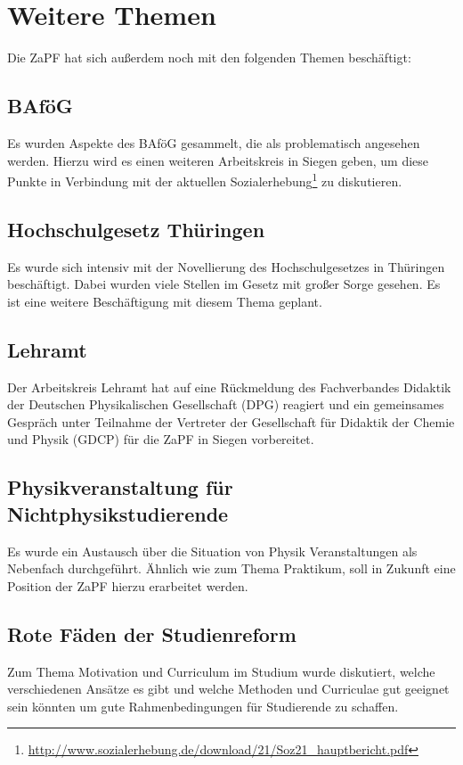 \documentclass[a4paper]{article}
\begin{document}
        
\section*{Weitere Themen}

Die ZaPF hat sich außerdem noch mit den folgenden Themen beschäftigt:

\subsection*{BAföG}
Es wurden Aspekte des BAföG gesammelt, die als problematisch angesehen werden.
Hierzu wird es einen weiteren Arbeitskreis in Siegen geben, um diese Punkte in Verbindung mit der aktuellen Sozialerhebung\footnote{\href{http://www.sozialerhebung.de/download/21/Soz21_hauptbericht.pdf}{\url{http://www.sozialerhebung.de/download/21/Soz21_hauptbericht.pdf}}} zu diskutieren. 

\subsection*{Hochschulgesetz Thüringen}
Es wurde sich intensiv mit der Novellierung des Hochschulgesetzes in Thüringen beschäftigt. Dabei wurden viele Stellen im Gesetz mit großer Sorge gesehen. Es ist eine weitere Beschäftigung mit diesem Thema geplant.

\subsection*{Lehramt}
Der Arbeitskreis Lehramt hat auf eine Rückmeldung des Fachverbandes Didaktik der Deutschen Physikalischen Gesellschaft (DPG) reagiert und ein gemeinsames Gespräch unter Teilnahme der Vertreter der Gesellschaft für Didaktik der Chemie und Physik (GDCP) für die ZaPF in Siegen vorbereitet.

\subsection*{Physikveranstaltung für Nichtphysikstudierende}
Es wurde ein Austausch über die Situation von Physik Veranstaltungen als Nebenfach durchgeführt. Ähnlich wie zum Thema Praktikum, soll in Zukunft eine Position der ZaPF hierzu erarbeitet werden. 

\subsection*{Rote Fäden der Studienreform}
Zum Thema Motivation und Curriculum im Studium wurde diskutiert, welche verschiedenen Ansätze es gibt und welche Methoden und Curriculae gut geeignet sein könnten um gute Rahmenbedingungen für Studierende zu schaffen.
\end{document}
